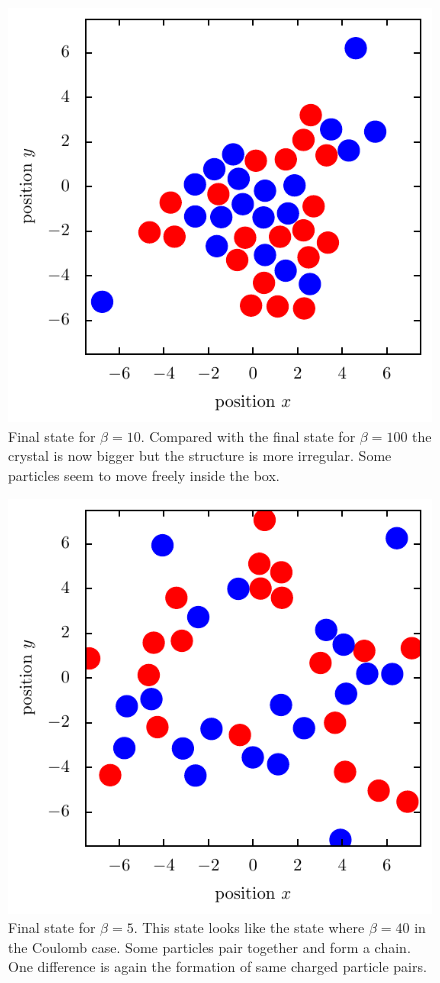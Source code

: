 \documentclass[11pt, a4paper]{article}
\numberwithin{equation}{section}
\begin{document}
\begin{figure}[!h]
\centering
\includegraphics[scale=1]{figures/Beta_10_LJ.pdf}
\caption{Final state for $\beta = 10$.
Compared with the final state for $\beta=100$ the crystal is now bigger but the structure is more irregular.
Some particles seem to move freely inside the box.}
\end{figure}

\begin{figure}[!h]
\centering
\includegraphics[scale=1]{figures/Beta_5_LJ.pdf}
\caption{Final state for $\beta = 5$.
This state looks like the state where $\beta = 40$ in the Coulomb case.
Some particles pair together and form a chain.
One difference is again the formation of same charged particle pairs.}
\end{figure}
\end{document}
